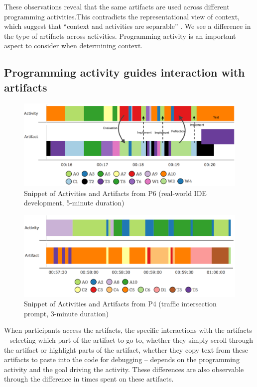 These observations reveal that the same artifacts are used across different programming activities.This contradicts the representational view of context, which suggest that ``context and activities are separable'' \cite{Dourish:2004,Gasparic:2017}. We see a difference in the type of artifacts across activities. Programming activity is an important aspect to consider when determining context. 



\subsection{Programming activity guides interaction with artifacts}

\begin{figure}
\includegraphics[width=1.98\columnwidth]{figures/P6timeplot}
\caption{Snippet of Activities and Artifacts from P6 (real-world IDE development, 5-minute duration)}
\label{P6Fig}
\end{figure}


\begin{figure}
\includegraphics[width=\columnwidth]{figures/P4timeplot}
\caption{Snippet of Activities and Artifacts from P4 (traffic intersection prompt, 3-minute duration)}
\label{P4Fig}
\end{figure}

When participants access the artifacts, the specific interactions with the artifacts -- selecting which part of the artifact to go to, whether they simply scroll through the artifact or highlight parts of the artifact, whether they copy text from these artifacts to paste into the code for debugging -- depends on the programming activity and the goal driving the activity. These differences are also observable through the difference in times spent on these artifacts.

